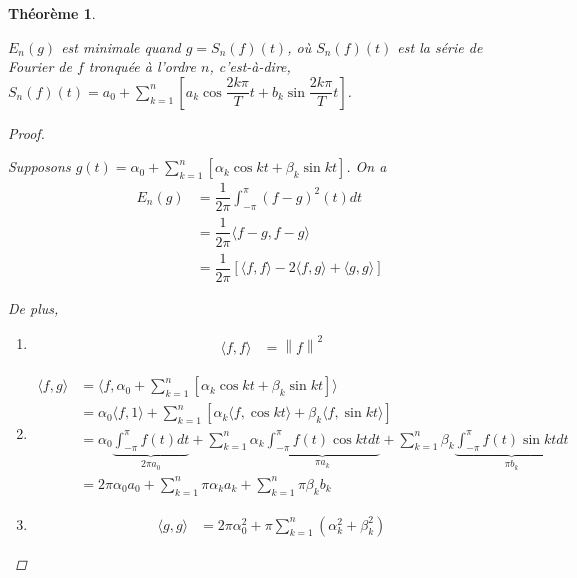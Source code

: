 \documentclass{report}
\newcommand*{\dsum}[4]{\displaystyle\sum_{#1=#2}^{#3}#4}
\newcommand*{\dint}[3]{\displaystyle\int_{#1}^{#2}#3}
\newcommand*{\norme}[1]{\left\| #1 \right\|}
\newtheorem*{thm}{Th\'eor\`eme}
\theoremstyle{definition}
\theoremstyle{remark}
\begin{document}
	\begin{thm}~

		$E_n(g)$ est minimale quand $g = S_n(f)(t)$, o\`u $S_n(f)(t)$ est la s\'erie de Fourier de $f$ tronqu\'ee \`a l'ordre $n$, c'est-\`a-dire, $S_n(f)(t) = a_0 + \dsum{k}{1}{n}{\left[a_k\cos\dfrac{2k\pi}{T}t + b_k\sin\dfrac{2k\pi}{T}t\right]}$.
		\begin{proof}~

			Supposons $g(t) = \alpha_0 + \dsum{k}{1}{n}{\left[\alpha_k\cos kt + \beta_k\sin kt\right]}$. On a
			\begin{align*}
				E_n(g)&= \dfrac{1}{2\pi} \dint{-\pi}{\pi}{(f-g)^2(t) dt}\\
				&= \dfrac{1}{2\pi} \langle f-g,f-g \rangle\\
				&= \dfrac{1}{2\pi} \left[\langle f,f \rangle - 2 \langle f,g \rangle + \langle g,g \rangle\right]
			\end{align*}

			De plus,
			\begin{enumerate}[label=\alph*)]
				\item
				\begin{align*}
					\langle f,f \rangle&= \norme{f}^2
				\end{align*}
				\item
				\begin{align*}
					\langle f,g \rangle&= \langle f, \alpha_0 + \dsum{k}{1}{n}{\left[\alpha_k\cos kt + \beta_k\sin kt\right]} \rangle\\
					&= \alpha_0 \langle f,1 \rangle + \dsum{k}{1}{n}{\left[\alpha_k \langle f,\cos kt \rangle + \beta_k \langle f,\sin kt \rangle\right]}\\
					&= \alpha_0 \underbrace{\dint{-\pi}{\pi}{f(t) dt}}_{2\pi a_0} + \dsum{k}{1}{n}{\alpha_k \underbrace{\dint{-\pi}{\pi}{f(t) \cos kt dt}}_{\pi a_k}} + \dsum{k}{1}{n}{\beta_k \underbrace{\dint{-\pi}{\pi}{f(t) \sin kt dt}}_{\pi b_k}}\\
					&= 2\pi \alpha_0 a_0 + \dsum{k}{1}{n}{\pi \alpha_k a_k} + \dsum{k}{1}{n}{\pi \beta_k b_k}
				\end{align*}
				\item
				\begin{align*}
					\langle g,g \rangle&= 2\pi \alpha_0^2 + \pi \dsum{k}{1}{n}{\left(\alpha_k^2 + \beta_k^2\right)}
				\end{align*}
			\end{enumerate}


\end{proof}
\end{thm}
\end{document}
